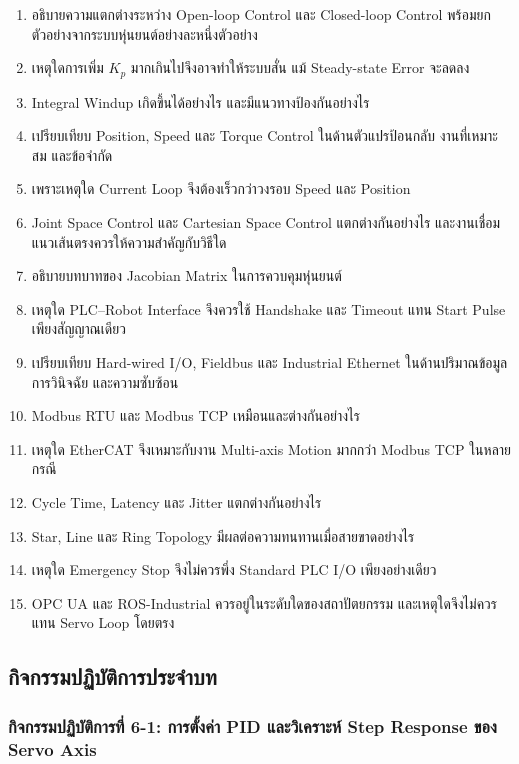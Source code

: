 \begin{enumerate}
    \item อธิบายความแตกต่างระหว่าง Open-loop Control และ Closed-loop Control พร้อมยกตัวอย่างจากระบบหุ่นยนต์อย่างละหนึ่งตัวอย่าง
    \item เหตุใดการเพิ่ม $K_p$ มากเกินไปจึงอาจทำให้ระบบสั่น แม้ Steady-state Error จะลดลง
    \item Integral Windup เกิดขึ้นได้อย่างไร และมีแนวทางป้องกันอย่างไร
    \item เปรียบเทียบ Position, Speed และ Torque Control ในด้านตัวแปรป้อนกลับ งานที่เหมาะสม และข้อจำกัด
    \item เพราะเหตุใด Current Loop จึงต้องเร็วกว่าวงรอบ Speed และ Position
    \item Joint Space Control และ Cartesian Space Control แตกต่างกันอย่างไร และงานเชื่อมแนวเส้นตรงควรให้ความสำคัญกับวิธีใด
    \item อธิบายบทบาทของ Jacobian Matrix ในการควบคุมหุ่นยนต์
    \item เหตุใด PLC–Robot Interface จึงควรใช้ Handshake และ Timeout แทน Start Pulse เพียงสัญญาณเดียว
    \item เปรียบเทียบ Hard-wired I/O, Fieldbus และ Industrial Ethernet ในด้านปริมาณข้อมูล การวินิจฉัย และความซับซ้อน
    \item Modbus RTU และ Modbus TCP เหมือนและต่างกันอย่างไร
    \item เหตุใด EtherCAT จึงเหมาะกับงาน Multi-axis Motion มากกว่า Modbus TCP ในหลายกรณี
    \item Cycle Time, Latency และ Jitter แตกต่างกันอย่างไร
    \item Star, Line และ Ring Topology มีผลต่อความทนทานเมื่อสายขาดอย่างไร
    \item เหตุใด Emergency Stop จึงไม่ควรพึ่ง Standard PLC I/O เพียงอย่างเดียว
    \item OPC UA และ ROS-Industrial ควรอยู่ในระดับใดของสถาปัตยกรรม และเหตุใดจึงไม่ควรแทน Servo Loop โดยตรง
\end{enumerate}

\newpage

\subsection{กิจกรรมปฏิบัติการประจำบท}

\subsubsection{กิจกรรมปฏิบัติการที่ 6-1: การตั้งค่า PID และวิเคราะห์ Step Response ของ Servo Axis}


